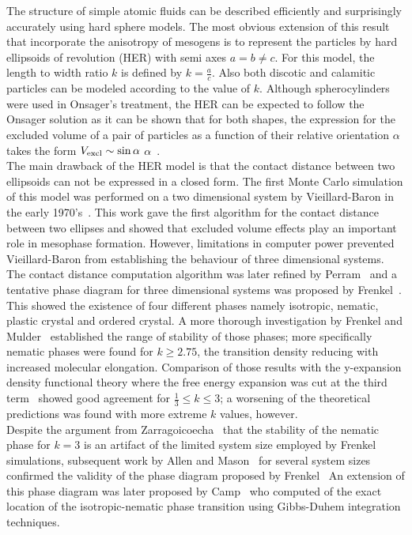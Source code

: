 The structure of simple atomic fluids can be described efficiently and surprisingly accurately 
using hard sphere models. 
The most obvious extension of this result that incorporate the anisotropy of mesogens is to
represent the particles by hard ellipsoids of revolution (HER) with semi axes $a=b\neq c$. For
this model, the length to width ratio $k$ is defined by $k=\frac{a}{c}$. Also both discotic
and calamitic particles can be modeled according to the value of $k$.
Although spherocylinders were used in Onsager's treatment, the HER can be expected to follow the
Onsager solution as it can be shown that for both shapes, the expression for the excluded volume 
of a pair of particles as a function of their relative orientation $\alpha$ takes the form
$V_{\mathrm{excl}}\sim\sin\alpha$ $\alpha$~\cite{FrenkelMulder85}.\\
%
The main drawback of the HER model is that the contact distance between two ellipsoids can not be
expressed in a closed form. 
The first Monte Carlo simulation of this model was performed on a two dimensional system by 
Vieillard-Baron in the early 1970's~\cite{VieillardBaron72}. This work gave the first algorithm for the
contact distance between two ellipses and showed that excluded volume effects
play an important role in mesophase formation. However, limitations in computer power
prevented Vieillard-Baron from establishing the behaviour of three dimensional systems. The contact 
distance computation algorithm was later refined by Perram~\etal\cite{PerramWertheim84,PerramWertheim85} 
and a tentative phase diagram for three
dimensional systems was proposed by Frenkel~\etal\cite{FrenkelMulder81}. This showed
the existence of four different phases namely isotropic, nematic, plastic crystal and ordered
crystal. A more thorough investigation by Frenkel and Mulder~\cite{FrenkelMulder85} established the
range of stability of those phases; more specifically nematic phases were found for $k \geq
2.75$, the transition density reducing with increased molecular elongation.
Comparison of those results with the y-expansion
density functional theory where the free energy expansion was cut at the third 
term~\cite{MulderFrenkel85} showed good agreement for $\frac{1}{3} \leq k \leq 3$; a worsening 
of the theoretical predictions was found with more extreme $k$ values, however.\\
Despite the argument from Zarragoicoecha~\etal\cite{Zarragoicoecha92} that the stability of 
the nematic phase for $k=3$ is an artifact of the limited system size employed by Frenkel \etal
simulations, subsequent work
by Allen and Mason~\cite{AllenMason86} for several system sizes confirmed the validity
of the phase diagram proposed by Frenkel~\etal
An extension of this phase diagram was later proposed by Camp~\etal\cite{CampMason96} who
computed of the exact location of the isotropic-nematic phase transition using Gibbs-Duhem
integration techniques.\\

